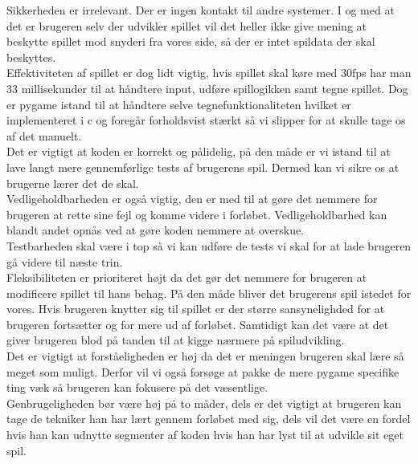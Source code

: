 \documentclass[10pt,a4paper,danish]{article}
\begin{document}
Sikkerheden er irrelevant. Der er ingen kontakt til andre systemer. I og med at det er brugeren selv der udvikler spillet vil det heller ikke give mening at beskytte spillet mod snyderi fra vores side, så der er intet spildata der skal beskyttes.
\\

Effektiviteten af spillet er dog lidt vigtig, hvis spillet skal køre med 30fps har man 33 millisekunder til at håndtere input, udføre spillogikken samt tegne spillet. Dog er pygame istand til at håndtere selve tegnefunktionaliteten hvilket er implementeret i c og foregår forholdsvist stærkt så vi slipper for at skulle tage os af det manuelt.
\\

Det er vigtigt at koden er korrekt og pålidelig, på den måde er vi istand til at lave langt mere gennemførlige tests af brugerens spil. Dermed kan vi sikre os at brugerne lærer det de skal.
\\

Vedligeholdbarheden er også vigtig, den er med til at gøre det nemmere for brugeren at rette sine fejl og komme videre i forløbet. Vedligeholdbarhed kan blandt andet opnås ved at gøre koden nemmere at overskue.
\\

Testbarheden skal være i top så vi kan udføre de tests vi skal for at lade brugeren gå videre til næste trin.
\\

Fleksibiliteten er prioriteret højt da det gør det nemmere for brugeren at modificere spillet til hans behag. På den måde bliver det brugerens spil istedet for vores. Hvis brugeren knytter sig til spillet er der større sansynelighded for at brugeren fortsætter og for mere ud af forløbet. Samtidigt kan det være at det giver brugeren blod på tanden til at kigge nærmere på spiludvikling.
\\

Det er vigtigt at forståeligheden er høj da det er meningen brugeren skal lære så meget som muligt. Derfor vil vi også forsøge at pakke de mere pygame specifike ting væk så brugeren kan fokusere på det væsentlige.
\\

Genbrugeligheden bør være høj på to måder, dels er det vigtigt at brugeren kan tage de tekniker han har lært gennem forløbet med sig, dels vil det være en fordel hvis han kan udnytte segmenter af koden hvis han har lyst til at udvikle sit eget spil.
\\
\end{document}
